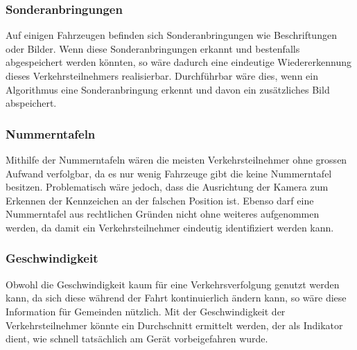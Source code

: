 \subsubsection{Sonderanbringungen}
Auf einigen Fahrzeugen befinden sich Sonderanbringungen wie Beschriftungen oder Bilder. Wenn diese Sonderanbringungen erkannt und bestenfalls abgespeichert werden könnten, so wäre dadurch eine eindeutige Wiedererkennung dieses Verkehrsteilnehmers realisierbar. Durchführbar wäre dies, wenn ein Algorithmus eine Sonderanbringung erkennt und davon ein zusätzliches Bild abspeichert.

\subsubsection{Nummerntafeln}
Mithilfe der Nummerntafeln wären die meisten Verkehrsteilnehmer ohne grossen Aufwand verfolgbar, da es nur wenig Fahrzeuge gibt die keine Nummerntafel besitzen. Problematisch wäre jedoch, dass die Ausrichtung der Kamera zum Erkennen der Kennzeichen an der falschen Position ist. Ebenso darf eine Nummerntafel aus rechtlichen Gründen nicht ohne weiteres aufgenommen werden, da damit ein Verkehrsteilnehmer eindeutig identifiziert werden kann.

\subsubsection{Geschwindigkeit}
Obwohl die Geschwindigkeit kaum für eine Verkehrsverfolgung genutzt werden kann, da sich diese während der Fahrt kontinuierlich ändern kann, so wäre diese Information für Gemeinden nützlich. Mit der Geschwindigkeit der Verkehrsteilnehmer könnte ein Durchschnitt ermittelt werden, der als Indikator dient, wie schnell tatsächlich am Gerät vorbeigefahren wurde.